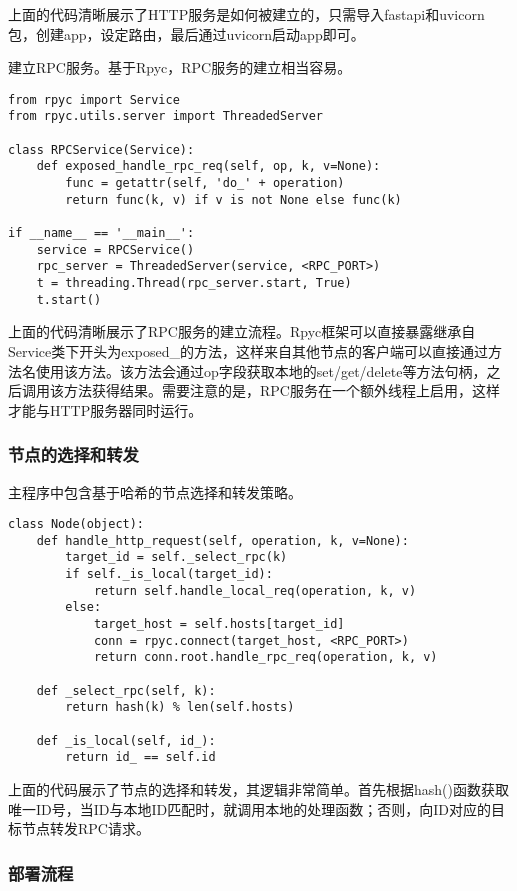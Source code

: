上面的代码清晰展示了HTTP服务是如何被建立的，只需导入fastapi和uvicorn包，创建app，设定路由，最后通过uvicorn启动app即可。

建立RPC服务。基于Rpyc，RPC服务的建立相当容易。

\begin{lstlisting}
from rpyc import Service
from rpyc.utils.server import ThreadedServer

class RPCService(Service):
    def exposed_handle_rpc_req(self, op, k, v=None):
        func = getattr(self, 'do_' + operation)
        return func(k, v) if v is not None else func(k)

if __name__ == '__main__':
    service = RPCService() 
    rpc_server = ThreadedServer(service, <RPC_PORT>)
    t = threading.Thread(rpc_server.start, True)
    t.start()
\end{lstlisting}

上面的代码清晰展示了RPC服务的建立流程。Rpyc框架可以直接暴露继承自Service类下开头为exposed\_的方法，这样来自其他节点的客户端可以直接通过方法名使用该方法。该方法会通过op字段获取本地的set/get/delete等方法句柄，之后调用该方法获得结果。需要注意的是，RPC服务在一个额外线程上启用，这样才能与HTTP服务器同时运行。

\subsubsection{节点的选择和转发}

主程序中包含基于哈希的节点选择和转发策略。

\begin{lstlisting}
class Node(object):
    def handle_http_request(self, operation, k, v=None):
        target_id = self._select_rpc(k)
        if self._is_local(target_id):
            return self.handle_local_req(operation, k, v)
        else:
            target_host = self.hosts[target_id]
            conn = rpyc.connect(target_host, <RPC_PORT>)
            return conn.root.handle_rpc_req(operation, k, v)
        
    def _select_rpc(self, k):
        return hash(k) % len(self.hosts)

    def _is_local(self, id_):
        return id_ == self.id
\end{lstlisting}

上面的代码展示了节点的选择和转发，其逻辑非常简单。首先根据hash()函数获取唯一ID号，当ID与本地ID匹配时，就调用本地的处理函数；否则，向ID对应的目标节点转发RPC请求。

\subsubsection{部署流程}

